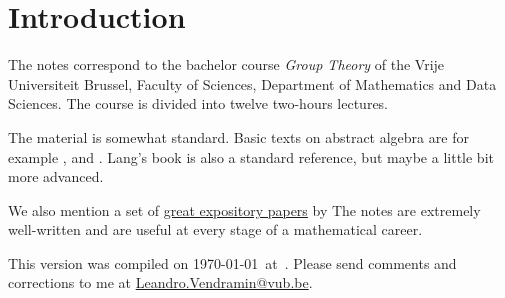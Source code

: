 \section*{Introduction}

The notes correspond to the bachelor 
course \emph{Group Theory} of the 
Vrije Universiteit Brussel, 
Faculty of Sciences, 
Department of Mathematics and Data Sciences. The course
is divided into twelve two-hours lectures. 

The material is somewhat standard. Basic texts on abstract algebra
are for example \cite{MR1129886}, \cite{MR2286236} and \cite{MR600654}. 
Lang's book \cite{MR783636} is also a standard reference, but 
maybe a little bit more advanced. 

We also mention a set of 
\href{https://kconrad.math.uconn.edu/blurbs/}{great expository papers} by 
The notes are extremely well-written and are useful at  
every stage of a mathematical career. 



This version 
was compiled on \today~at~\currenttime. 
Please send comments and corrections to me at \url{Leandro.Vendramin@vub.be}. 


